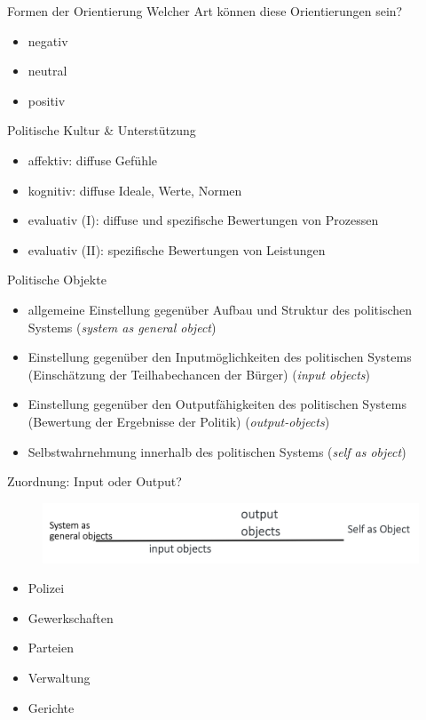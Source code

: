 \documentclass[11pt]{beamer}
\begin{document}
\begin{frame}[t]{Formen der Orientierung}
	Welcher Art können diese Orientierungen sein? \pause
	\begin{itemize}
		\item negativ
		\item neutral
		\item positiv
	\end{itemize}
\end{frame}

\begin{frame}[t]{Politische Kultur \& Unterstützung}
	\begin{itemize}
		\item affektiv: diffuse Gefühle \pause
		\item kognitiv: diffuse Ideale, Werte, Normen \pause
		\item evaluativ (I): diffuse und spezifische Bewertungen von Prozessen \pause
		\item evaluativ (II): spezifische Bewertungen von Leistungen
	\end{itemize}

\end{frame}

\begin{frame}[t]{Politische Objekte}
	 \pause
	\begin{itemize}
		\item allgemeine Einstellung gegenüber Aufbau und Struktur des politischen Systems (\textit{system as general object}) \pause
		\item Einstellung gegenüber den Inputmöglichkeiten des politischen Systems (Einschätzung der Teilhabechancen der Bürger) (\textit{input objects}) \pause
		\item Einstellung gegenüber den Outputfähigkeiten des politischen Systems (Bewertung der Ergebnisse der Politik) (\textit{output-objects}) \pause
		\item Selbstwahrnehmung innerhalb des politischen Systems (\textit{self as object})
	\end{itemize}
\end{frame}

\begin{frame}[t]{Zuordnung: Input oder Output?}
	\begin{figure}[ht]
		\includegraphics[width=\textwidth]{pics/s3-2.png}
	\end{figure}
	
	\begin{itemize}
		\item Polizei \pause
		\item Gewerkschaften \pause
		\item Parteien \pause
		\item Verwaltung \pause
		\item Gerichte \pause
	\end{itemize}
\end{frame}
\end{document}
